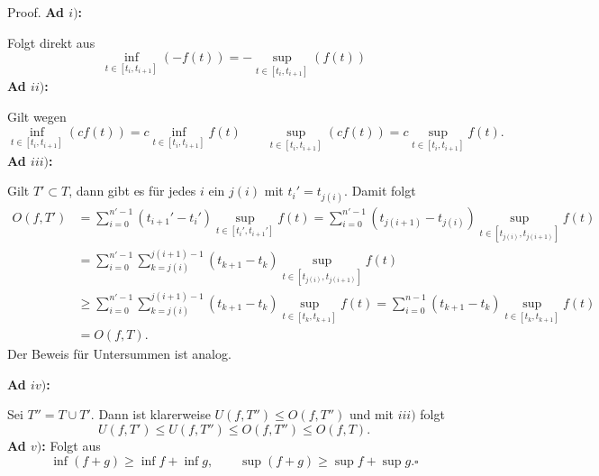 \begin{emphBox}{}{}
Proof. \textbf{Ad \(i)\):}

Folgt direkt aus
\begin{equation*}
\inf_{t \in [t_i,t_{i+1}]}(-f(t)) = - \sup_{t \in [t_i,t_{i+1}]}(f(t))
\end{equation*}
\textbf{Ad \(ii)\):}

Gilt wegen
\begin{equation*}
 \inf_{t \in [t_i,t_{i+1}]} (c f(t)) = c \inf_{t \in [t_i,t_{i+1}]} f(t) \qquad \sup_{t \in [t_i,t_{i+1}]} (c f(t)) = c \sup_{t \in [t_i,t_{i+1}]} f(t).
\end{equation*}
\textbf{Ad \(iii)\):}

Gilt \(T' \subset T\), dann gibt es für jedes \(i\) ein \(j(i)\) mit \(t_i' =t_{j(i)}\). Damit folgt
\begin{align*} O(f,T') &= \sum_{i=0}^{n'-1} (t_{i+1}' - t_i') \sup_{t \in  [t_i',t_{i+1}']} f(t) =\sum_{i=0}^{n'-1} (t_{j(i+1)} - t_{j(i)}) \sup_{t \in  [t_{j(i)},t_{j(i+1)}]} f(t) \\
&= \sum_{i=0}^{n'-1} \sum_{k=j(i)}^{j(i+1)-1} (t_{k+1} - t_{k}) \sup_{t \in  [t_{j(i)},t_{j(i+1)}]} f(t)  \\
&\geq \sum_{i=0}^{n'-1} \sum_{k=j(i)}^{j(i+1)-1} (t_{k+1} - t_{k}) \sup_{t \in  [t_{k},t_{k+1}]} f(t)   =\sum_{i=0}^{n-1} (t_{k+1} - t_{k}) \sup_{t \in  [t_{k},t_{k+1}]} f(t)  \\ &= O(f,T).
\end{align*}
Der Beweis für Untersummen ist analog.

\textbf{Ad \(iv)\):}

Sei \(T''= T \cup T'\). Dann ist klarerweise \(U(f,T'') \leq O(f,T'')\) und mit \(iii)\) folgt
\begin{equation*}
 U(f,T') \leq U(f,T'') \leq O(f,T'') \leq O(f,T) .
\end{equation*}
\textbf{Ad \(v)\):}
Folgt aus
\begin{equation*}
 \inf (f+g) \geq \inf f + \inf g, \qquad \sup (f+g) \geq \sup f + \sup g.  \square
\end{equation*}\end{emphBox}


